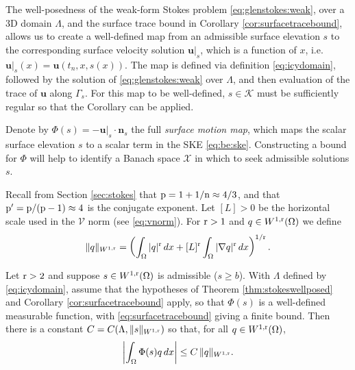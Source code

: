 \documentclass[hidelinks,onefignum,onetabnum,final]{siamart220329}  %
\newcommand{\grad}{\nabla}
\newcommand{\bn}{\mathbf{n}}
\newcommand{\bu}{\mathbf{u}}
\newcommand{\cK}{\mathcal{K}}
\newcommand{\cV}{\mathcal{V}}
\newcommand{\cX}{\mathcal{X}}
\newcommand{\nn}{{\text{\textnormal{n}}}}
\newcommand{\pp}{{\text{\textnormal{p}}}}
\newcommand{\rr}{{\text{\textnormal{r}}}}
\begin{document}
The well-posedness of the weak-form Stokes problem \eqref{eq:glenstokes:weak}, over a 3D domain $\Lambda$, and the surface trace bound in Corollary \ref{cor:surfacetracebound}, allows us to create a well-defined map from an admissible surface elevation $s$ to the corresponding surface velocity solution $\bu|_s$, which is a function of $x$, i.e.~$\bu|_s(x) = \bu(t_n,x,s(x))$.  The map is defined via definition \eqref{eq:icydomain}, followed by the solution of \eqref{eq:glenstokes:weak} over $\Lambda$, and then evaluation of the trace of $\bu$ along $\Gamma_s$.  For this map to be well-defined, $s\in\cK$ must be sufficiently regular so that the Corollary can be applied.

Denote by $\Phi(s) = - \bu|_s\cdot \bn_s$ the full \emph{surface motion map}, which maps the scalar surface elevation $s$ to a scalar term in the SKE \eqref{eq:be:ske}.  Constructing a bound for $\Phi$ will help to identify a Banach space $\cX$ in which to seek admissible solutions $s$.

Recall from Section \ref{sec:stokes} that $\pp=1+1/\nn \approx 4/3$, and that $\pp'=\pp/(\pp-1) \approx 4$ is the conjugate exponent.  Let $[L]>0$ be the horizontal scale used in the $\cV$ norm (see \eqref{eq:vnorm}).  For $\rr>1$ and $q\in W^{1,\rr}(\Omega)$ we define
\begin{equation}
\|q\|_{W^{1,\rr}} = \left(\int_\Omega |q|^\rr\,dx + [L]^\rr \int_\Omega |\grad q|^\rr\,dx\right)^{1/\rr}. \label{eq:norm:Omega}
\end{equation}

\begin{lemma}[Preliminary bound on $\Phi(s)=- \bu|_s\cdot \bn_s$] \label{lem:phibound:early}
Let $\rr > 2$ and suppose $s\in W^{1,\rr}(\Omega)$ is admissible ($s\ge b$).  With $\Lambda$ defined by \eqref{eq:icydomain}, assume that the hypotheses of Theorem \ref{thm:stokeswellposed} and Corollary \ref{cor:surfacetracebound} apply, so that $\Phi(s)$ is a well-defined measurable function, with \eqref{eq:surfacetracebound} giving a finite bound.  Then there is a constant $C=C(\Lambda,\|s\|_{W^{1,\rr}})$ so that, for all $q\in W^{1,\rr}(\Omega)$,
\begin{equation}
\left|\int_\Omega \Phi(s) q\,dx\right| \le C\, \|q\|_{W^{1,\rr}}.  \label{eq:phibound:early}
\end{equation}
\end{lemma}
\end{document}
